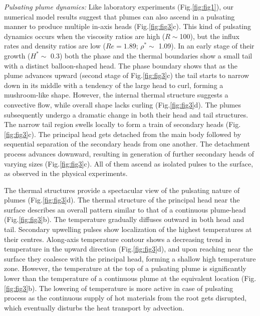 \documentclass[12pt]{article}
\begin{document}
{\textit{Pulsating plume dynamics:} Like laboratory experiments (Fig.\ref{fig:fig1}), 
our numerical model results suggest that plumes can also ascend in a pulsating manner 
to produce multiple in-axis heads (Fig.\ref{fig:fig3}c). This kind of pulsating 
dynamics occurs when the viscosity ratios are high ($R\sim$100), but the influx 
rates and density ratios are low ($Re = 1.89$; $\rho^*\sim$ 1.09). In an 
early stage of their growth ($H^* \sim$ 0.3) both the phase and the thermal 
 boundaries show a small tail with a distinct balloon-shaped head. The phase 
 boundary shows that as the plume advances upward (second stage of Fig.\ref{fig:fig3}c) 
 the tail starts to narrow down in its middle with a tendency of the large head 
 to curl, forming a mushroom-like shape. However, the internal thermal 
  structure suggests a convective flow, while overall shape lacks 
  curling (Fig.\ref{fig:fig3}d). The plumes subsequently undergo a dramatic 
  change in both their head and tail structures. The narrow tail region 
  swells locally to form a train of secondary heads (Fig.\ref{fig:fig3}c). 
  The principal head gets detached from the main body followed by sequential 
  separation of the secondary heads from one another. The detachment process 
  advances downward, resulting in generation of further secondary heads of 
  varying sizes (Fig.\ref{fig:fig3}c).  All of them ascend as isolated pulses 
   to the surface, as observed in the physical experiments.


The thermal structures provide a spectacular view of the pulsating nature of 
plumes (Fig.\ref{fig:fig3}d). The thermal structure of the principal head near the surface describes an overall pattern similar to that of a continuous plume-head 
(Fig.\ref{fig:fig3}b). The temperature gradually diffuses outward in 
both head and tail. Secondary upwelling pulses show localization of the highest temperatures at their centres. Along-axis temperature contour shows a decreasing trend in 
temperature in the upward direction (Fig.\ref{fig:fig3}d), and upon reaching near 
the surface they coalesce with the principal head, forming a shallow high 
temperature zone. However, the 
temperature at the top of a pulsating plume is significantly lower than the temperature of a continuous plume at the equivalent location (Fig.\ref{fig:fig3}b). The lowering of temperature is more active in case of pulsating process as the continuous supply of hot materials from the root gets disrupted, which eventually disturbs the heat transport by advection. 


}
\end{document}
